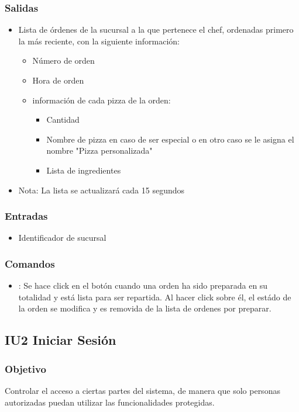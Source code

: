 \documentclass[oneside,10pt]{book}
\begin{document}
\subsubsection{Salidas}
\begin{itemize} 
	\item Lista de órdenes de la sucursal a la que pertenece el chef, ordenadas primero la más reciente, con la siguiente información:
	\begin{itemize}
		\item Número de orden
		\item Hora de orden
		\item información de cada pizza de la orden:
		\begin{itemize}
			\item Cantidad
			\item Nombre de pizza en caso de ser especial o en otro caso se le asigna el nombre "Pizza personalizada"
			\item Lista de ingredientes
		\end{itemize}
	\end{itemize}
	\item Nota: La lista se actualizará cada 15 segundos
\end{itemize}
\subsubsection{Entradas}
\begin{itemize}
	\item Identificador de sucursal
\end{itemize}

\subsubsection{Comandos}
\begin{itemize}
	\item {}:  Se hace click en el botón cuando una orden ha sido preparada en su totalidad y está lista para ser repartida. Al hacer click sobre él, el estádo de la orden se modifica y es removida de la lista de ordenes por preparar.
\end{itemize}

\subsection{IU2 Iniciar Sesión}

\subsubsection{Objetivo}
Controlar el acceso a ciertas partes del sistema, de manera que solo personas autorizadas puedan utilizar las funcionalidades protegidas.
\end{document}
